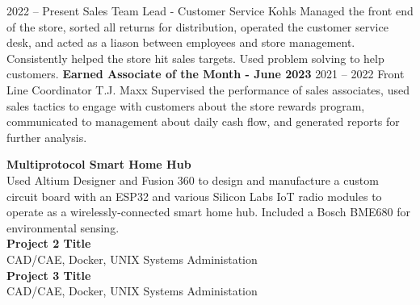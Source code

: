 \documentclass[9pt]{developercv} %
\begin{document}

\begin{entrylist}
	\entry
		{2022 -- Present}
		{Sales Team Lead - Customer Service}
		{Kohls}
		{Managed the front end of the store, sorted all returns for distribution, operated the customer service desk, and acted as a liason between employees and store management. Consistently helped the store hit sales targets. Used problem solving to help customers. \textbf{Earned Associate of the Month - June 2023} }
		\entry
		{2021 -- 2022}
		{Front Line Coordinator}
		{T.J. Maxx}
		{Supervised the performance of sales associates, used sales tactics to engage with customers about the store rewards program, communicated to management about daily cash flow, and generated reports for further analysis.}
\end{entrylist}



\begin{minipage}[t]{1\textwidth} %
	\vspace{-\baselineskip} %
	\textbf{Multiprotocol Smart Home Hub}\\
	Used Altium Designer and Fusion 360 to design and manufacture a custom circuit board with an ESP32 and various Silicon Labs IoT radio modules to operate as a wirelessly-connected smart home hub. Included a Bosch BME680 for environmental sensing.\\
	\linebreak
	\textbf{Project 2 Title}\\
	CAD/CAE, Docker, UNIX Systems Administation\\
	\linebreak
	\textbf{Project 3 Title}\\
	CAD/CAE, Docker, UNIX Systems Administation\\
\end{minipage}

\vspace{0.5cm}

\end{document}
